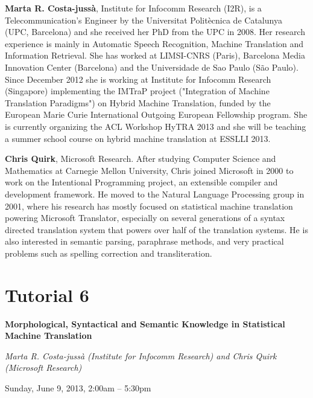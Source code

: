 \begin{bio}
\setlength{\parskip}{1ex}

\noindent
{\bfseries Marta R. Costa-jussà}, Institute for Infocomm Research (I2R), is a Telecommunication's Engineer by the Universitat Politècnica de Catalunya (UPC, Barcelona) and she received her PhD from the UPC in 2008. Her research experience is mainly in Automatic Speech Recognition, Machine Translation and Information Retrieval. She has worked at LIMSI-CNRS (Paris), Barcelona Media Innovation Center (Barcelona) and the Universidade de Sao Paulo (São Paulo). Since December 2012 she is working at Institute for Infocomm Research (Singapore) implementing the IMTraP project ("Integration of Machine Translation Paradigms") on Hybrid Machine Translation, funded by the European Marie Curie International Outgoing European Fellowship program. She is currently organizing the ACL Workshop HyTRA 2013 and she will be teaching a summer school course on hybrid machine translation at ESSLLI 2013.

\noindent
{\bfseries Chris Quirk}, Microsoft Research. After studying Computer Science and Mathematics at Carnegie Mellon University, Chris joined Microsoft in 2000 to work on the Intentional Programming project, an extensible compiler and development framework. He moved to the Natural Language Processing group in 2001, where his research has mostly focused on statistical machine translation powering Microsoft Translator, especially on several generations of a syntax directed translation system that powers over half of the translation systems. He is also interested in semantic parsing, paraphrase methods, and very practical problems such as spelling correction and transliteration.
\end{bio}

\section%
    [\textbf{T6:} Morphological, Syntactical and Semantic Knowledge in Statistical Machine Translation (M.~R. Costa-juss\`{a} and C. Quirk)]
    {Tutorial 6}
\label{TutF}
\begin{center}
\begin{Large}
\bfseries Morphological, Syntactical and Semantic Knowledge in Statistical Machine Translation\\ \vspace{2em}\par
\end{Large}

{\itshape Marta R. Costa-juss\`{a} (Institute for Infocomm Research) and Chris Quirk (Microsoft Research)}\vspace{1em}\par
Sunday, June 9, 2013, 2:00am -- 5:30pm \vspace{1em}\\
\TutLocF
\end{center}


